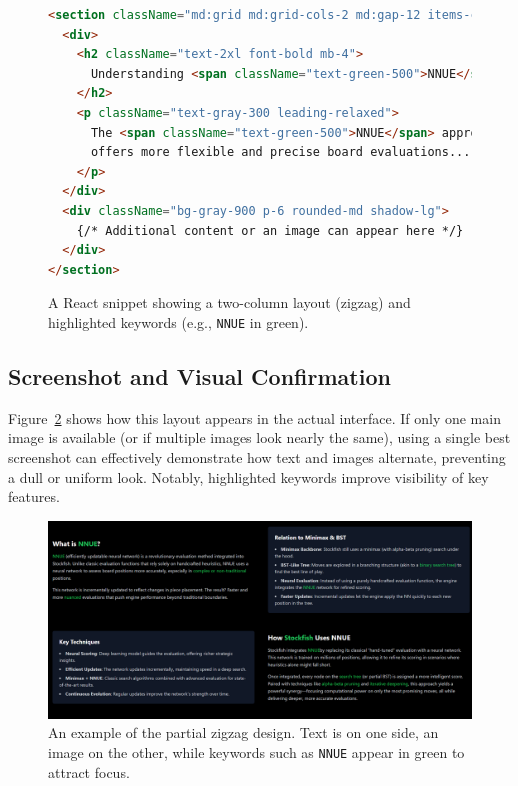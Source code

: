 \documentclass[12pt,a4paper]{article}
\begin{document}
\begin{figure}[htb]
\centering
\begin{lstlisting}[language=HTML, breaklines=true, basicstyle=\small\ttfamily]
<section className="md:grid md:grid-cols-2 md:gap-12 items-center">
  <div>
    <h2 className="text-2xl font-bold mb-4">
      Understanding <span className="text-green-500">NNUE</span>
    </h2>
    <p className="text-gray-300 leading-relaxed">
      The <span className="text-green-500">NNUE</span> approach 
      offers more flexible and precise board evaluations...
    </p>
  </div>
  <div className="bg-gray-900 p-6 rounded-md shadow-lg">
    {/* Additional content or an image can appear here */}
  </div>
</section>
\end{lstlisting}
\caption{A React snippet showing a two-column layout (zigzag) and 
highlighted keywords (e.g., \texttt{NNUE} in green).}
\label{lst:design_snippet}
\end{figure}

\subsection{Screenshot and Visual Confirmation}
Figure~\ref{fig:design_screenshot} shows how this layout appears 
in the actual interface. If only one main image is available (or 
if multiple images look nearly the same), using a single best 
screenshot can effectively demonstrate how text and images 
alternate, preventing a dull or uniform look. Notably, highlighted 
keywords improve visibility of key features.

\begin{figure}[H]
    \centering
    \includegraphics[scale=0.35]{figures/zigzag_interface.png}
    \caption{An example of the partial zigzag design. 
    Text is on one side, an image on the other, while 
    keywords such as \texttt{NNUE} appear in green 
    to attract focus.}
    \label{fig:design_screenshot}
\end{figure}
\end{document}
